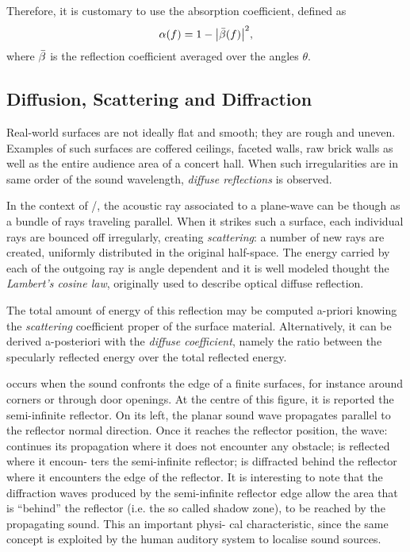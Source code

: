 Therefore, it is customary to use the absorption coefficient, defined as
\begin{equation}
    \absCoeff(f) = 1 - \abs{\bar{\reflCoeff}(f)}^2
    ,
\end{equation}
where $\bar{\beta}$ is the reflection coefficient averaged over the angles $\theta$.

\subsection{Diffusion, Scattering and Diffraction}
Real-world surfaces are not ideally flat and smooth; they are rough and uneven.
Examples of such surfaces are coffered ceilings, faceted walls, raw brick walls as well as the entire audience area of a concert hall.
When such irregularities are in same order of the sound wavelength, \textit{diffuse reflections} is observed.

In the context of \GA/, the acoustic ray associated to a plane-wave can be though as a bundle of rays traveling parallel.
When it strikes such a surface, each individual rays are bounced off irregularly, creating \textit{scattering}:
a number of new rays are created, uniformly distributed in the original half-space.
The energy carried by each of the outgoing ray is angle dependent and it
is well modeled thought the \textit{Lambert's cosine law}, originally used to describe optical diffuse reflection.

The total amount of energy of this reflection may be computed a-priori
knowing the \textit{scattering} coefficient proper of the surface material.
Alternatively, it can be derived a-posteriori with the \textit{diffuse coefficient}, namely the ratio between
the specularly reflected energy over the total reflected energy.

 occurs when the sound confronts the edge of a finite surfaces, for instance around corners or through door openings.
At the centre of this figure, it is reported the semi-infinite reflector. On its left, the planar sound wave propagates parallel to the reflector normal direction. Once it reaches the reflector position, the wave: continues its propagation where it does not encounter any obstacle; is reflected where it encoun- ters the semi-infinite reflector; is diffracted behind the reflector where it encounters the edge of the reflector. It is interesting to note that the diffraction waves produced by the semi-infinite reflector edge allow the area that is “behind” the reflector (i.e. the so called shadow zone), to be reached by the propagating sound. This an important physi- cal characteristic, since the same concept is exploited by the human auditory system to localise sound sources.

